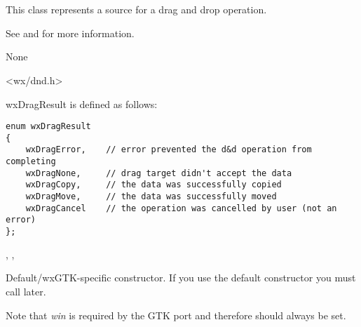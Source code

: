 \section{}\label{wxdropsource}

This class represents a source for a drag and drop operation.

See  and 
for more information.


None


<wx/dnd.h>


wxDragResult is defined as follows:

{\small\begin{verbatim}
enum wxDragResult
{
    wxDragError,    // error prevented the d&d operation from completing
    wxDragNone,     // drag target didn't accept the data
    wxDragCopy,     // the data was successfully copied
    wxDragMove,     // the data was successfully moved
    wxDragCancel    // the operation was cancelled by user (not an error)
};
\end{verbatim}
}


, 
, 


\label{wxdropsourcewxdropsource}


Default/wxGTK-specific constructor. If you use the default constructor you must
call  later.

Note that {\it win} is required by the GTK port and therefore should always be set.

\label{wxdropsourcedtor}


\label{wxdropsourcesetdata}


